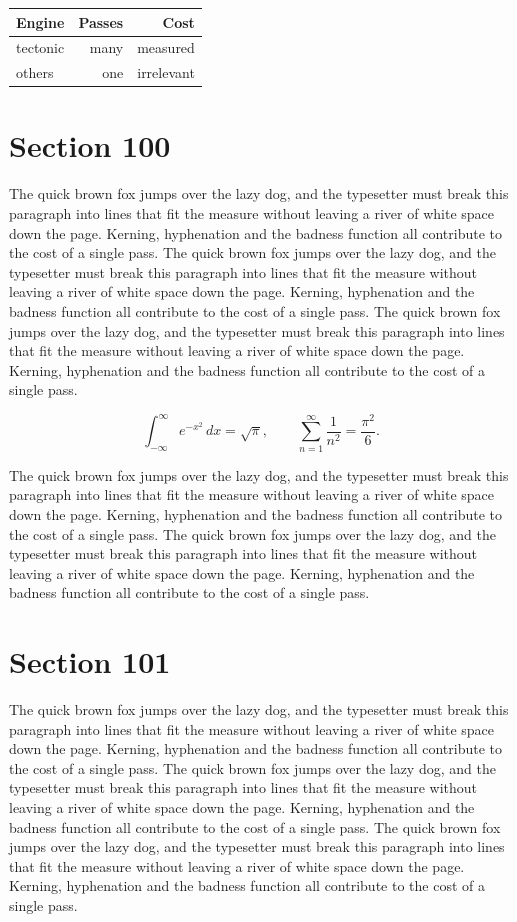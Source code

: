 \documentclass{article}
\begin{document}
\begin{center}
\begin{tabular}{lrr}
\toprule
Engine & Passes & Cost \\
\midrule
tectonic & many & measured \\
others & one & irrelevant \\
\bottomrule
\end{tabular}
\end{center}

\section{Section 100}
The quick brown fox jumps over the lazy dog, and the typesetter must break this paragraph into lines that fit the measure without leaving a river of white space down the page. Kerning, hyphenation and the badness function all contribute to the cost of a single pass. The quick brown fox jumps over the lazy dog, and the typesetter must break this paragraph into lines that fit the measure without leaving a river of white space down the page. Kerning, hyphenation and the badness function all contribute to the cost of a single pass. The quick brown fox jumps over the lazy dog, and the typesetter must break this paragraph into lines that fit the measure without leaving a river of white space down the page. Kerning, hyphenation and the badness function all contribute to the cost of a single pass. 

\begin{equation}
\int_{-\infty}^{\infty} e^{-x^{2}}\,dx = \sqrt{\pi}, \qquad
\sum_{n=1}^{\infty} \frac{1}{n^{2}} = \frac{\pi^{2}}{6}.
\end{equation}

The quick brown fox jumps over the lazy dog, and the typesetter must break this paragraph into lines that fit the measure without leaving a river of white space down the page. Kerning, hyphenation and the badness function all contribute to the cost of a single pass. The quick brown fox jumps over the lazy dog, and the typesetter must break this paragraph into lines that fit the measure without leaving a river of white space down the page. Kerning, hyphenation and the badness function all contribute to the cost of a single pass. 
\section{Section 101}
The quick brown fox jumps over the lazy dog, and the typesetter must break this paragraph into lines that fit the measure without leaving a river of white space down the page. Kerning, hyphenation and the badness function all contribute to the cost of a single pass. The quick brown fox jumps over the lazy dog, and the typesetter must break this paragraph into lines that fit the measure without leaving a river of white space down the page. Kerning, hyphenation and the badness function all contribute to the cost of a single pass. The quick brown fox jumps over the lazy dog, and the typesetter must break this paragraph into lines that fit the measure without leaving a river of white space down the page. Kerning, hyphenation and the badness function all contribute to the cost of a single pass. 
\end{document}
